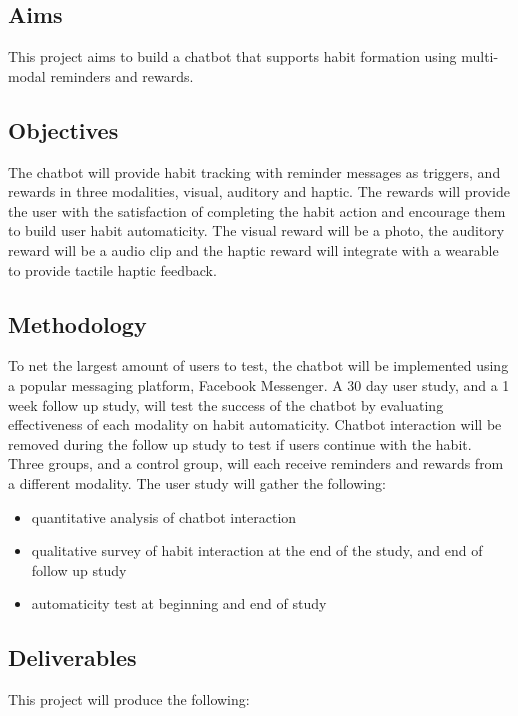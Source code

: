 \subsection*{Aims}
This project aims to build a chatbot that supports habit formation using multi-modal reminders and rewards.

\subsection*{Objectives}
The chatbot will provide habit tracking with reminder messages as triggers, and rewards in three modalities, visual, auditory and haptic.\newline
\newline
The rewards will provide the user with the satisfaction of completing the habit action and encourage them to build user habit automaticity. The visual reward will be a photo, the auditory reward will be a audio clip and the haptic reward will integrate with a wearable to provide tactile haptic feedback.

\subsection*{Methodology}
To net the largest amount of users to test, the chatbot will be implemented using a popular messaging platform, Facebook Messenger.\newline
\newline
A 30 day user study, and a 1 week follow up study, will test the success of the chatbot by evaluating effectiveness of each modality on habit automaticity. Chatbot interaction will be removed during the follow up study to test if users continue with the habit. Three groups, and a control group, will each receive reminders and rewards from a different modality.\newline
\newline
The user study will gather the following:
\begin{itemize}
  \item quantitative analysis of chatbot interaction
  \item qualitative survey of habit interaction at the end of the study, and end of follow up study
  \item automaticity test at beginning and end of study
\end{itemize}

\subsection*{Deliverables}
This project will produce the following:\newline

